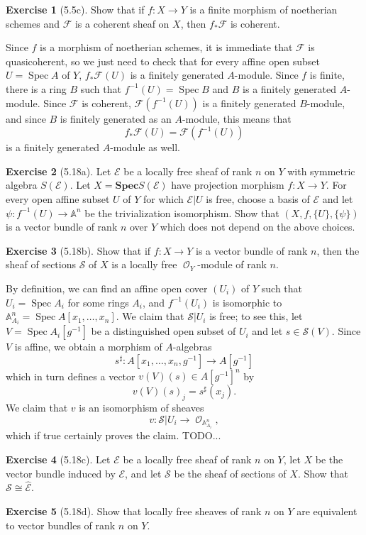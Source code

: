 \documentclass[10pt]{article}
\newcommand{\Aff}{\mathbb A}
\newcommand{\Spec}{\operatorname{Spec}}
\newcommand{\SymSpec}{\mathbf{Spec}}
\DeclareMathOperator{\Olo}{\mathscr O}
\theoremstyle{definition}
\newtheorem{exer}{Exercise}
\begin{document}
\begin{exer}[5.5c]
Show that if $f: X \to Y$ is a finite morphism of noetherian schemes and $\mathscr F$ is a coherent sheaf on $X$, then $f_* \mathscr F$ is coherent.
\end{exer}

Since $f$ is a morphism of noetherian schemes, it is immediate that $\mathscr F$ is quasicoherent, so we just need to check that for every affine open subset $U = \Spec A$ of $Y$, $f_* \mathscr F(U)$ is a finitely generated $A$-module.
Since $f$ is finite, there is a ring $B$ such that $f^{-1}(U) = \Spec B$ and $B$ is a finitely generated $A$-module.
Since $\mathscr F$ is coherent, $\mathscr F(f^{-1}(U))$ is a finitely generated $B$-module, and since $B$ is finitely generated as an $A$-module, this means that
$$f_* \mathscr F(U) = \mathscr F(f^{-1}(U))$$
is a finitely generated $A$-module as well.

\begin{exer}[5.18a]
Let $\mathscr E$ be a locally free sheaf of rank $n$ on $Y$ with symmetric algebra $S(\mathscr E)$.
Let $X = \SymSpec S(\mathscr E)$ have projection morphism $f: X \to Y$.
For every open affine subset $U$ of $Y$ for which $\mathscr E|U$ is free, choose a basis of $\mathscr E$ and let $\psi: f^{-1}(U) \to \Aff^n$ be the trivialization isomorphism.
Show that $(X, f, \{U\}, \{\psi\})$ is a vector bundle of rank $n$ over $Y$ which does not depend on the above choices.
\end{exer}

\begin{exer}[5.18b]
Show that if $f: X \to Y$ is a vector bundle of rank $n$, then the sheaf of sections $\mathscr S$ of $X$ is a locally free $\Olo_Y$-module of rank $n$.
\end{exer}

By definition, we can find an affine open cover $(U_i)$ of $Y$ such that $U_i = \Spec A_i$ for some rings $A_i$, and $f^{-1}(U_i)$ is isomorphic to $\Aff^n_{A_i} = \Spec A[x_1, \dots, x_n]$.
We claim that $\mathscr S|U_i$ is free; to see this, let $V = \Spec A_i[g^{-1}]$ be a distinguished open subset of $U_i$ and let $s \in \mathscr S(V)$.
Since $V$ is affine, we obtain a morphism of $A$-algebras
$$s^\sharp: A[x_1, \dots, x_n, g^{-1}] \to A[g^{-1}]$$
which in turn defines a vector $v(V)(s) \in A[g^{-1}]^n$ by
$$v(V)(s)_j = s^\sharp(x_j).$$
We claim that $v$ is an isomorphism of sheaves
$$v: \mathscr S|U_i \to \Olo_{\Aff^n_{A_i}},$$
which if true certainly proves the claim. TODO...

\begin{exer}[5.18c]
Let $\mathscr E$ be a locally free sheaf of rank $n$ on $Y$, let $X$ be the vector bundle induced by $\mathscr E$, and let $\mathscr S$ be the sheaf of sections of $X$.
Show that $\mathscr S \cong \widehat{\mathscr E}$.
\end{exer}

\begin{exer}[5.18d]
Show that locally free sheaves of rank $n$ on $Y$ are equivalent to vector bundles of rank $n$ on $Y$.
\end{exer}
\end{document}
